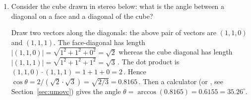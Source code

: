 \begin{example}
\begin{enumerate}
\item Consider the cube drawn in stereo below: what is the angle between a diagonal on a face and a diagonal of the cube?
\begin{center}
 {
}
\end{center}
\begin{solution} 
Draw two vectors along the diagonals: the above pair of vectors are \((1,1,0)\) and \((1,1,1)\).
The face-diagonal has length \(|(1,1,0)|=\sqrt{1^2+1^2+0^2}=\sqrt2\) whereas the cube diagonal has length \(|(1,1,1)|=\sqrt{1^2+1^2+1^2}=\sqrt3\)\,.
The dot product is \((1,1,0)\cdot(1,1,1)=1+1+0=2\)\,.
Hence  \(\cos\theta=2/(\sqrt2\cdot\sqrt3)=\sqrt{2/3}=0.8165\)\,.
Then a calculator (or \script, see Section~\ref{sec:umovc}) gives the angle \(\theta =\arccos(0.8165) =0.6155 =35.26^\circ\).
\end{solution}



\end{enumerate}
\end{example}
